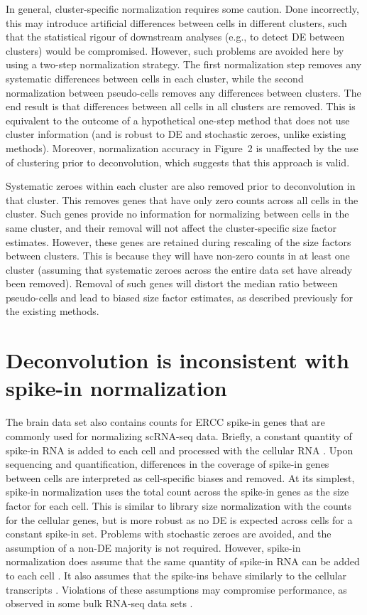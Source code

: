 \documentclass{article}
\newcommand{\figdeconv}{2}
\begin{document}
In general, cluster-specific normalization requires some caution.
Done incorrectly, this may introduce artificial differences between cells in different clusters, 
    such that the statistical rigour of downstream analyses (e.g., to detect DE between clusters) would be compromised.
However, such problems are avoided here by using a two-step normalization strategy.
The first normalization step removes any systematic differences between cells in each cluster, 
    while the second normalization between pseudo-cells removes any differences between clusters.
The end result is that differences between all cells in all clusters are removed.
This is equivalent to the outcome of a hypothetical one-step method that does not use cluster information (and is robust to DE and stochastic zeroes, unlike existing methods).
Moreover, normalization accuracy in Figure~\figdeconv{} is unaffected by the use of clustering prior to deconvolution, which suggests that this approach is valid.

Systematic zeroes within each cluster are also removed prior to deconvolution in that cluster.
This removes genes that have only zero counts across all cells in the cluster.
Such genes provide no information for normalizing between cells in the same cluster, and their removal will not affect the cluster-specific size factor estimates.
However, these genes are retained during rescaling of the size factors between clusters.
This is because they will have non-zero counts in at least one cluster (assuming that systematic zeroes across the entire data set have already been removed).
Removal of such genes will distort the median ratio between pseudo-cells and lead to biased size factor estimates, as described previously for the existing methods.

\section{Deconvolution is inconsistent with spike-in normalization}
The brain data set also contains counts for ERCC spike-in genes that are commonly used for normalizing scRNA-seq data.
Briefly, a constant quantity of spike-in RNA is added to each cell and processed with the cellular RNA \cite{stegle2015computational}.
Upon sequencing and quantification, differences in the coverage of spike-in genes between cells are interpreted as cell-specific biases and removed.
At its simplest, spike-in normalization uses the total count across the spike-in genes as the size factor for each cell.
This is similar to library size normalization with the counts for the cellular genes, but is more robust as no DE is expected across cells for a constant spike-in set.
Problems with stochastic zeroes are avoided, and the assumption of a non-DE majority is not required.
However, spike-in normalization does assume that the same quantity of spike-in RNA can be added to each cell \cite{robinson2010scaling,marinov2014singlecell}.
It also assumes that the spike-ins behave similarly to the cellular transcripts \cite{grun2015design}.
Violations of these assumptions may compromise performance, as observed in some bulk RNA-seq data sets \cite{risso2014normalization}.
\end{document}
